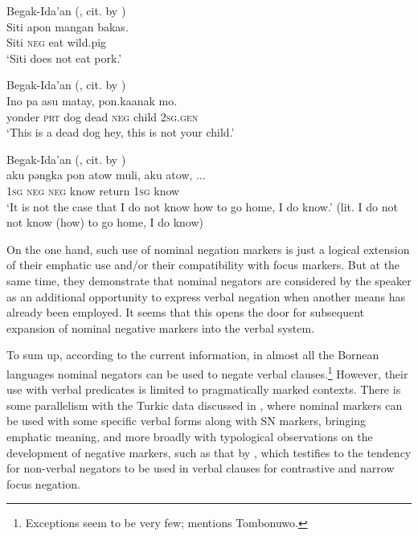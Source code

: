 \documentclass[output=paper,draft,draftmode,colorlinks,citecolor=brown]{langscibook}
\begin{document}
\ea Begak-Ida’an (\citealp[300]{goudswaard2005a}, cit. by \citealp[15]{kroeger2014a}) \label{ex:BK63}\\
	\gll Siti		apon	mangan	bakas.\\
	Siti		\textsc{neg}	eat		wild.pig\\
	\glt `Siti does not eat pork.'
\z

\ea Begak-Ida’an (\citealp[304]{goudswaard2005a}, cit. by \citealp[15]{kroeger2014a}) \label{ex:BK64}\\
	\gll Ino			pa		asu	matay,	pon.ka\footnotemark	anak	mo.\\
	yonder	\textsc{prt}	dog	dead		\textsc{neg}		child	\textsc{2sg.gen}\\
	\glt `This is a dead dog hey, this is not your child.'\footnotemark
\z



\ea Begak-Ida’an (\citealp[305]{goudswaard2005a}, cit. by \citealp[16]{kroeger2014a}) \label{ex:BK65}\\
	\gll aku	pǝngka	pon	atow		muli,		aku	atow, ...\\
	\textsc{1sg}	\textsc{neg}		\textsc{neg}	know		return	\textsc{1sg}	know\\
	\glt `It is not the case that I do not know how to go home, I do know.' (lit. I do not not know (how) to go home, I do know)
\z


On the one hand, such use of nominal negation markers is just a logical extension of their emphatic use and/or their compatibility with focus markers. But at the same time, they demonstrate that nominal negators are considered by the speaker as an additional opportunity to express verbal negation when another means has already been employed. It seems that this opens the door for subsequent expansion of nominal negative markers into the verbal system.

To sum up, according to the current information, in almost all the Bornean languages nominal negators can be used to negate verbal clauses.\footnote{Exceptions seem to be very few; \citet{kroeger2014a} mentions Tombonuwo.} However, their use with verbal predicates is limited to pragmatically marked contexts. There is some parallelism with the Turkic data discussed in , where nominal markers can be used with some specific verbal forms along with SN markers, bringing emphatic meaning, and more broadly with typological observations on the development of negative markers, such as that by \citet{Horn1989}, which testifies to the tendency for non-verbal negators to be used in verbal clauses for contrastive and narrow focus negation.
\end{document}
